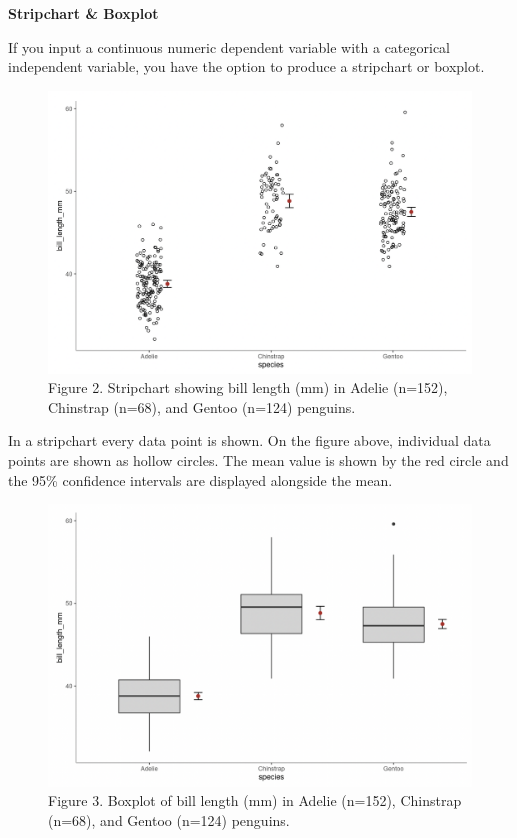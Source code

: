 \documentclass[
]{book}
\begin{document}
\textbf{Stripchart \& Boxplot}

If you input a continuous numeric dependent variable with a categorical independent variable, you have the option to produce a stripchart or boxplot.

\begin{figure}
\centering
\includegraphics{figures_images/stripchart_ex.png}
\caption{Figure 2. Stripchart showing bill length (mm) in Adelie (n=152), Chinstrap (n=68), and Gentoo (n=124) penguins.}
\end{figure}

In a stripchart every data point is shown. On the figure above, individual data points are shown as hollow circles. The mean value is shown by the red circle and the 95\% confidence intervals are displayed alongside the mean.

\begin{figure}
\centering
\includegraphics{figures_images/boxplot_ex.png}
\caption{Figure 3. Boxplot of bill length (mm) in Adelie (n=152), Chinstrap (n=68), and Gentoo (n=124) penguins.}
\end{figure}
\end{document}

